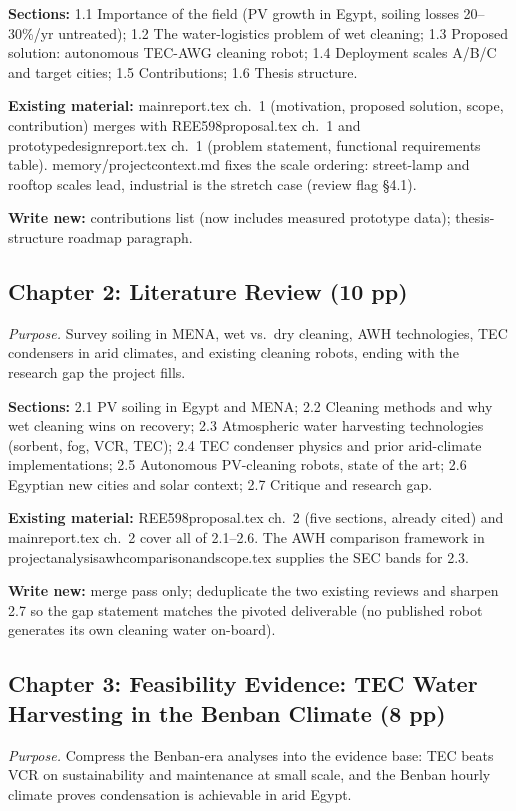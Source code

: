 \documentclass[11pt,a4paper]{article}
\newcommand{\f}[1]{{\ttfamily\def\_{\textunderscore\allowbreak}#1}}
\begin{document}
\textbf{Sections:} 1.1 Importance of the field (PV growth in Egypt, soiling
losses 20--30\%/yr untreated); 1.2 The water-logistics problem of wet cleaning;
1.3 Proposed solution: autonomous TEC-AWG cleaning robot; 1.4 Deployment scales
A/B/C and target cities; 1.5 Contributions; 1.6 Thesis structure.

\textbf{Existing material:} \f{main\_report.tex} ch.~1 (motivation, proposed
solution, scope, contribution) merges with \f{REE598\_proposal.tex} ch.~1 and
\f{prototype\_design\_report.tex} ch.~1 (problem statement, functional
requirements table). \f{memory/project\_context.md} fixes the scale ordering:
street-lamp and rooftop scales lead, industrial is the stretch case (review
flag \S4.1).

\textbf{Write new:} contributions list (now includes measured prototype data);
thesis-structure roadmap paragraph.

\subsection{Chapter 2: Literature Review (10 pp)}
\textit{Purpose.} Survey soiling in MENA, wet vs.\ dry cleaning, AWH
technologies, TEC condensers in arid climates, and existing cleaning robots,
ending with the research gap the project fills.

\textbf{Sections:} 2.1 PV soiling in Egypt and MENA; 2.2 Cleaning methods and
why wet cleaning wins on recovery; 2.3 Atmospheric water harvesting technologies
(sorbent, fog, VCR, TEC); 2.4 TEC condenser physics and prior arid-climate
implementations; 2.5 Autonomous PV-cleaning robots, state of the art; 2.6
Egyptian new cities and solar context; 2.7 Critique and research gap.

\textbf{Existing material:} \f{REE598\_proposal.tex} ch.~2 (five sections,
already cited) and \f{main\_report.tex} ch.~2 cover all of 2.1--2.6. The AWH
comparison framework in \f{project\_analysis\_awh\_comparison\_and\_scope.tex}
supplies the SEC bands for 2.3.

\textbf{Write new:} merge pass only; deduplicate the two existing reviews and
sharpen 2.7 so the gap statement matches the pivoted deliverable (no published
robot generates its own cleaning water on-board).

\subsection{Chapter 3: Feasibility Evidence: TEC Water Harvesting in the
Benban Climate (8 pp)}
\textit{Purpose.} Compress the Benban-era analyses into the evidence base: TEC
beats VCR on sustainability and maintenance at small scale, and the Benban
hourly climate proves condensation is achievable in arid Egypt.
\end{document}
